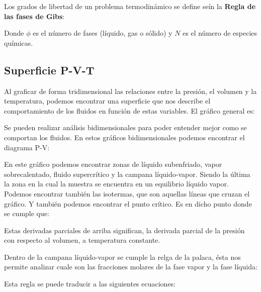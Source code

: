 Los grados de libertad de un problema termodinámico se define seín la \textbf{Regla de las fases de Gibs}:


Donde $\phi$ es el número de fases (líquido, gas o sólido) y $N$ es el número de especies químicas.

\subsection{Superficie P-V-T}

Al graficar de forma tridimensional las relaciones entre la presión, el volumen y la temperatura, podemos encontrar una superficie que nos describe el comportamiento de los fluidos en función de estas variables.
El gráfico general es:


Se pueden realizar análisis bidimensionales para poder entender mejor como se comportan los fluidos. En estos gráficos bidimensionales podemos encontrar el diagrama P-V:


En este gráfico podemos encontrar zonas de líquido subenfriado, vapor sobrecalentado, fluido supercrítico y la campana líquido-vapor. Siendo la última la zona en la cual la muestra se encuentra en un equilibrio líquido vapor. Podemos encontrar también las isotermas, que son aquellas líneas que cruzan el gráfico. Y también podemos encontrar el punto crítico. Es en dicho punto donde se cumple que:


Estas derivadas parciales de arriba significan, la derivada parcial de la presión con respecto al volumen, a temperatura constante.

Dentro de la campana líquido-vapor se cumple la relga de la palaca, ésta nos permite analizar cuale son las fracciones molares de la fase vapor y la fase líquida:

Esta regla se puede traducir a las siguientes ecuaciones:

